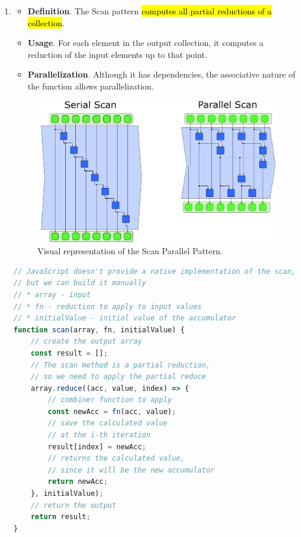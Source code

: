 \begin{enumerate}
    \item {}
    \begin{itemize}
        \item[\textcolor{Red2}{\faIcon{book}}] \textcolor{Red2}{\textbf{Definition}}. The Scan pattern \hl{computes all partial reductions of a collection}.

        \item[\textcolor{Green3}{\faIcon{tools}}] \textcolor{Green3}{\textbf{Usage}}. For each element in the output collection, it computes a reduction of the input elements up to that point.

        \item[\textcolor{Green3}{\faIcon{question-circle}}] \textcolor{Green3}{\textbf{Parallelization}}. Although it has dependencies, the associative nature of the function allows parallelization.
    \end{itemize}
    \begin{figure}[!htp]
        \centering
        \includegraphics[width=.84\textwidth]{img/scan-pattern-1.pdf}
        \caption{Visual representation of the Scan Parallel Pattern.}
    \end{figure}
    \begin{examplebox}
        \begin{lstlisting}[language=JavaScript]
// JavaScript doesn't provide a native implementation of the scan,
// but we can build it manually
// * array - input
// * fn - reduction to apply to input values
// * initialValue - initial value of the accumulator
function scan(array, fn, initialValue) {
    // create the output array
    const result = [];
    // The scan method is a partial reduction,
    // so we need to apply the partial reduce
    array.reduce((acc, value, index) => {
        // combiner function to apply
        const newAcc = fn(acc, value);
        // save the calculated value
        // at the i-th iteration
        result[index] = newAcc;
        // returns the calculated value,
        // since it will be the new accumulator
        return newAcc;
    }, initialValue);
    // return the output
    return result;
}


\end{lstlisting}
\end{examplebox}
\end{enumerate}
